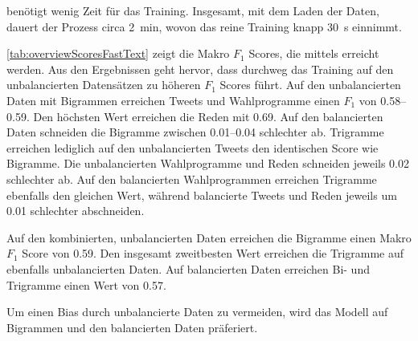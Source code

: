 \ft benötigt wenig Zeit für das Training. Insgesamt, mit dem Laden der Daten, dauert der Prozess circa \SI{2}{\minute}, wovon das reine Training knapp \SI{30}{\second} einnimmt.

\autoref{tab:overviewScoresFastText} zeigt die Makro \(F_1\) Scores, die mittels \ft erreicht werden. Aus den Ergebnissen geht hervor, dass durchweg das Training auf den unbalancierten Datensätzen zu höheren \(F_{1}\) Scores führt. Auf den unbalancierten Daten mit Bigrammen erreichen Tweets und Wahlprogramme einen \(F_{1}\) von \numrange{0.58}{0.59}. Den höchsten Wert erreichen die Reden mit \num{0.69}. Auf den balancierten Daten schneiden die Bigramme zwischen \numrange{0.01}{0.04} schlechter ab. Trigramme erreichen lediglich auf den unbalancierten Tweets den identischen Score wie Bigramme. Die unbalancierten Wahlprogramme und Reden schneiden jeweils \num{0.02} schlechter ab. Auf den balancierten Wahlprogrammen erreichen Trigramme ebenfalls den gleichen Wert, während balancierte Tweets und Reden jeweils um \num{0.01} schlechter abschneiden.

Auf den kombinierten, unbalancierten Daten erreichen die Bigramme einen Makro \(F_1\) Score von \num{0.59}. Den insgesamt zweitbesten Wert erreichen die Trigramme auf ebenfalls unbalancierten Daten. Auf balancierten Daten erreichen Bi- und Trigramme einen Wert von \num{0.57}.

Um einen Bias durch unbalancierte Daten zu vermeiden, wird das \ft Modell auf Bigrammen und den balancierten Daten präferiert.

